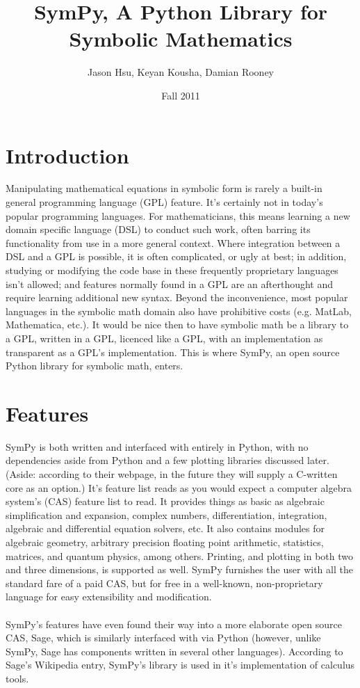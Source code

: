 \documentclass[11pt,a4paper,oneside]{report}
\begin{document}
\title{SymPy, A Python Library for Symbolic Mathematics}
\author{Jason Hsu, Keyan Kousha, Damian Rooney}
\date{Fall 2011}
\maketitle
\section*{Introduction}
Manipulating mathematical equations in symbolic form is rarely a built-in general programming language (GPL) feature. It's certainly not in today's popular programming languages. For mathematicians, this means learning a new domain specific language (DSL) to conduct such work, often barring its functionality from use in a more general context. Where integration between a DSL and a GPL is possible, it is often complicated, or ugly at best; in addition, studying or modifying the code base in these frequently proprietary languages isn't allowed; and features normally found in a GPL are an afterthought and require learning additional new syntax. Beyond the inconvenience, most popular languages in the symbolic math domain also have prohibitive costs (e.g. MatLab, Mathematica, etc.). It would be nice then to have symbolic math be a library to a GPL, written in a GPL, licenced like a GPL, with an implementation as transparent as a GPL's implementation. This is where SymPy, an open source Python library for symbolic math, enters.
\section*{Features}
SymPy is both written and interfaced with entirely in Python, with no dependencies aside from Python and a few plotting libraries discussed later. (Aside: according to their webpage, in the future they will supply a C-written core as an option.) It's feature list reads as you would expect a computer algebra system's (CAS) feature list to read. It provides things as basic as algebraic simplification and expansion, complex numbers, differentiation, integration, algebraic and differential equation solvers, etc. It also contains modules for algebraic geometry, arbitrary precision floating point arithmetic, statistics, matrices, and quantum physics, among others. Printing, and plotting in both two and three dimensions, is supported as well. SymPy furnishes the user with all the standard fare of a paid CAS, but for free in a well-known, non-proprietary language for easy extensibility and modification.\\\\
 SymPy's features have even found their way into a more elaborate open source CAS, Sage, which is similarly interfaced with via Python (however, unlike SymPy, Sage has components written in several other languages). According to Sage's Wikipedia entry, SymPy's library is used in it's implementation of calculus tools.
\end{document}
